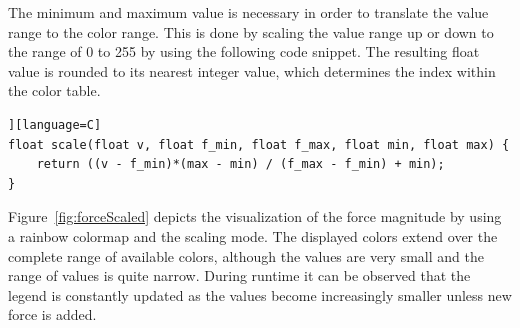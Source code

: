 The minimum and maximum value is necessary in order to translate the value range to the color range. This is done by scaling the value range up or down to the range of 0 to 255 by using the following code snippet. The resulting float value is rounded to its nearest integer value, which determines the index within the color table. 

\begin{lstlisting}][language=C]
float scale(float v, float f_min, float f_max, float min, float max) {
    return ((v - f_min)*(max - min) / (f_max - f_min) + min);
}
\end{lstlisting}

Figure~\ref{fig:forceScaled} depicts the visualization of the force magnitude by using a rainbow colormap and the scaling mode. The displayed colors extend over the complete range of available colors, although the values are very small and the range of values is quite narrow. During runtime it can be observed that the legend is constantly updated as the values become increasingly smaller unless new force is added. 


